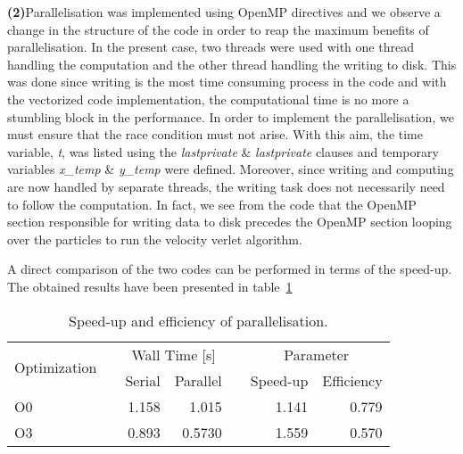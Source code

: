 \documentclass[11pt, oneside]{article}
\begin{document}
\textbf{(2)}\quad Parallelisation was implemented using OpenMP directives and we observe a change in the structure of the code in order to reap the maximum benefits of parallelisation. In the present case, two threads were used with one thread handling the computation and the other thread handling the writing to disk. This was done since writing is the most time consuming process in the code and with the vectorized code implementation, the computational time is no more a stumbling block in the performance. In order to implement the  parallelisation, we must ensure that the race condition must not arise. With this aim, the time variable, \textit{t}, was listed using the \textit{lastprivate} \& \textit{lastprivate} clauses and temporary variables \textit{x\_temp} \& \textit{y\_temp} were defined. Moreover, since writing and computing are now handled by separate threads, the writing task does not necessarily need to follow the computation. In fact, we see from the code that the OpenMP section responsible for writing data to disk precedes the OpenMP section looping over the particles to run the velocity verlet algorithm.

A direct comparison of the two codes can be performed in terms of the speed-up. The obtained results have been presented in  table~\ref{tab:su}
\begin{table}[h]
  \caption{Speed-up and efficiency of parallelisation.}
  \label{tab:su}
  \centering
  \begin{tabular}{lcrrcrr}
    \toprule
    \multirow{2}{*}{Optimization} &\phantom{abc} & \multicolumn{2}{c}{Wall Time [s]} &\phantom{abc} & \multicolumn{2}{c}{Parameter} \\
    \cmidrule{3-4} \cmidrule{6-7}
    &\phantom{abc} & {Serial} & {Parallel} & \phantom{abc} & {Speed-up} & {Efficiency}\\
    \midrule
    O0 && 1.158 & 1.015 && 1.141 & 0.779\\
    O3 && 0.893 & 0.5730 && 1.559 & 0.570\\
    \bottomrule
  \end{tabular}
\end{table}
\end{document}
